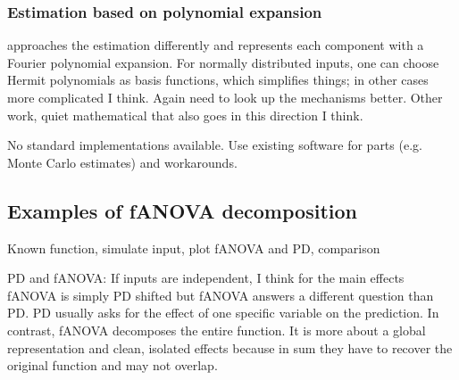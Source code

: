 \subsubsection*{Estimation based on polynomial expansion}
\cite{rahman2014} approaches the estimation differently and represents each component with a Fourier polynomial expansion. For normally distributed inputs, one can choose Hermit polynomials as basis functions, which simplifies things; in other cases more complicated I think.
Again need to look up the mechanisms better.
Other work, quiet mathematical that also goes in this direction I think.

No standard implementations available. Use existing software for parts (e.g. Monte Carlo estimates) and workarounds.

\subsection{Examples of fANOVA decomposition}
Known function, simulate input, plot fANOVA and PD, comparison

PD and fANOVA: If inputs are independent, I think for the main effects fANOVA is simply PD shifted but fANOVA answers a different question than PD. PD usually asks for the effect of one specific variable on the prediction. In contrast, fANOVA decomposes the entire function. It is more about a global representation and clean, isolated effects because in sum they have to recover the original function and may not overlap.

